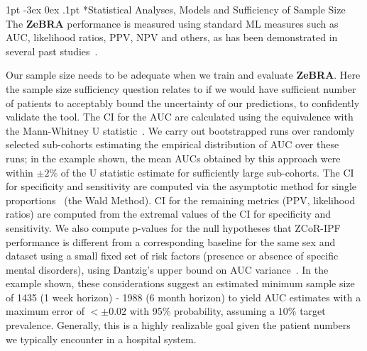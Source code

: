 \documentclass[onecolumn, compsoc,11pt]{IEEEtran}
\makeatletter
\def\zebra{\textbf{ZeBRA}\xspace}
\renewcommand\section{\@startsection {section}{1}{\z@}
  {1pt \@plus -3ex \@minus 0ex}
  {.1pt}
  {\large\bfseries\scshape\color{black!70}}}
\def\zebra{\textbf{ZeBRA}\xspace}
\def\zcor{\zebra}
\def\pcor{ZCoR-IPF\xspace}
\makeatother
\begin{document}
\section*{Statistical Analyses, Models and Sufficiency of Sample Size} The \zcor performance is measured using standard ML measures such as AUC, likelihood ratios, PPV, NPV and others, as has been demonstrated in several past studies~\cite{onishchenko2021reduced,onishchenko2022screening,JAHA2022}. 

Our sample size needs to be adequate when we train and evaluate \zcor . Here the sample size sufficiency question relates to if we would have sufficient number of patients to acceptably bound the uncertainty of our predictions, to confidently validate the tool. The CI for the  AUC are calculated using  the  equivalence with the Mann-Whitney U statistic~\cite{birnbaum1957bounds,mann1947test,wilcoxon1992individual}. We 
carry out bootstrapped runs over randomly selected sub-cohorts   estimating the empirical distribution of AUC over these runs; in the example shown, the mean AUCs obtained by this approach were within $\pm 2\%$ of the U statistic estimate for sufficiently large sub-cohorts. The CI for specificity and sensitivity are computed via  the asymptotic method for single proportions~\cite{newcombe1994confidence} (the Wald Method). CI for the remaining metrics (PPV, likelihood ratios) are computed from the extremal values of the CI for specificity and sensitivity. We also compute p-values for the null hypotheses that \pcor performance is different from a corresponding baseline for the same sex and dataset using a small fixed set of risk factors (presence or absence of specific mental disorders), using Dantzig's upper bound on AUC variance~\cite{birnbaum2020use,vandantzig1951consistency}.
 In the example shown, these considerations suggest an estimated minimum sample size 
 of  1435 (1 week horizon) -  1988 (6 month horizon) 
 to yield AUC estimates with a maximum error of $<\pm 0.02$ with 95\% probability, assuming a $10\%$ target prevalence. Generally, this is a highly realizable goal given the patient numbers we typically encounter in a hospital system.
\end{document}
